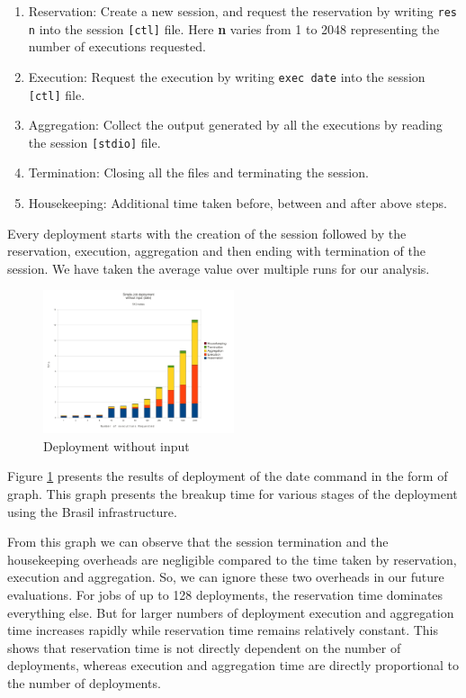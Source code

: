 \documentclass[conference]{sig-alternate}
\begin{document}
\begin{enumerate}
\item Reservation: Create a new session, and request the reservation by writing
\texttt{res n} into the session \texttt{[ctl]} file.  Here \textbf{n} varies
from 1 to 2048 representing the number of executions requested. 

\item Execution: Request the execution by writing \texttt{exec date} into the
session \texttt{[ctl]} file.

\item Aggregation: Collect the output generated by all the executions by reading
the session \texttt{[stdio]} file.

\item Termination: Closing all the files and terminating the session.

\item Housekeeping: Additional time taken before, between and after above steps.
\end{enumerate}
Every deployment starts with the creation of the session followed by the
reservation, execution, aggregation and then ending with termination of the
session.  We have taken the average value over multiple runs for our analysis.

\begin{figure}[h]
  \begin{center}
    \leavevmode
      \includegraphics[height=0.2\textheight,width=0.5\textwidth]
		{./img/date_graph}
    \caption{Deployment without input}
    \label{fig:date_graph}
  \end{center}
\end{figure}

Figure \ref{fig:date_graph} presents the results of deployment of the date
command in the form of graph.  This graph presents the breakup time for various
stages of the deployment using the Brasil infrastructure.

From this graph we can observe that the session termination and the housekeeping
overheads are negligible compared to the time taken by reservation, execution
and aggregation.  So, we can ignore these two overheads in our future
evaluations.  For jobs of up to 128 deployments, the reservation time dominates
everything else.  But for larger numbers of deployment execution and
aggregation time increases rapidly while reservation time remains relatively
constant. This shows that reservation time is not directly dependent on
the number of deployments, whereas execution and aggregation time are directly
proportional to the number of deployments.
\end{document}
